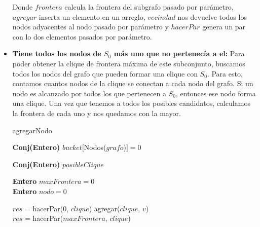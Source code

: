 \begin{itemize}
Donde $frontera$ calcula la frontera del subgrafo pasado por parámetro, $agregar$ inserta un elemento en un arreglo, $vecindad$ nos devuelve todos los nodos adyacentes al nodo pasado por parámetro y $hacerPar$ genera un par con lo dos elementos pasados por parámetro. \newline


\item \textbf{Tiene todos los nodos de $S_{0}$ más uno que no pertenecía a el:} \newline
Para poder obtener la clique de frontera máxima de este subconjunto, buscamos todos los nodos del grafo que pueden formar una clique con $S_{0}$. Para esto, contamos cuantos nodos de la clique se conectan a cada nodo del grafo. Si un nodo es alcanzado por todos los que pertenecen a $S_{0}$, entonces ese nodo forma una clique. Una vez que tenemos a todos los posibles candidatos, calculamos la frontera de cada uno y nos quedamos con la mayor. \newline

\begin{algorithm}[H]
    \SetAlgoLined
    \caption{agregarNodo}
	
    \textbf{Conj(Entero)} $bucket[$Nodos($grafo$)$] = 0$  \\
	

	
    \textbf{Conj(Entero)} $posibleClique$ \\

    \textbf{Entero} $maxFrontera = 0$ \\
    \textbf{Entero} $nodo = 0$ \\



	{$res$ = hacerPar(0, $clique$)}
    {	agregar($clique$, $v$) \\
	$res$ = hacerPar($maxFrontera$, $clique$) }


\end{algorithm}
\end{itemize}

